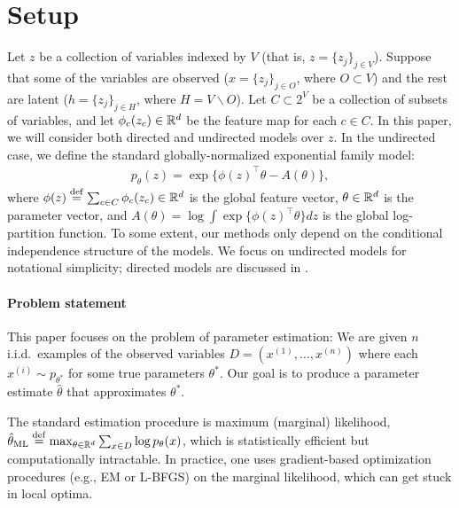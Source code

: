 \section{Setup} \label{sec:setup}

Let $z$ be a collection of variables indexed by $V$ (that is, $z = \{z_j\}_{j \in V}$).
Suppose that some of the variables are observed ($x = \{ z_j \}_{j \in O}$, where $O \subset V$) 
and the rest are latent ($h = \{ z_j \}_{j \in H}$, where $H = V \backslash O$).
Let $C \subset 2^V$ be a collection of subsets of variables,
and let $\phi_c(z_c) \in \mathbb{R}^d$ be the feature map for each $c \in C$.
In this paper, we will consider both directed and undirected models over $z$.
In the undirected case, we define the standard globally-normalized exponential family model:
\begin{align}
  \label{eqn:undirectedSetup}
  p_\theta(z) = \exp\{ \phi(z)^\top\theta - A(\theta) \},
\end{align}
where $\phi(z) \stackrel{\rm def}{=} \sum_{c \in C} \phi_c(z_c) \in \mathbb{R}^d$ is the global feature vector, $\theta \in \mathbb{R}^d$ is the parameter vector,
and $A(\theta) = \log \int \exp\{\phi(z)^\top\theta\} dz$ is the global log-partition function.
To some extent, our methods only depend on the conditional independence
structure of the models.
We focus on undirected models for notational simplicity;
directed models are discussed in .

\paragraph{Problem statement}

This paper focuses on the problem of parameter estimation:
We are given $n$ i.i.d.~examples of the observed variables $D = (x^{(1)}, \dots, x^{(n)})$
where each $x^{(i)} \sim p_{\theta^*}$ for some true parameters $\theta^*$.
Our goal is to produce a parameter estimate $\hat\theta$ that approximates $\theta^*$.

The standard estimation procedure is maximum (marginal) likelihood,
$\hat\theta_\text{\rm ML} \stackrel{\rm def}{=} \max_{\theta \in \mathbb{R}^d} \sum_{x \in D} \log p_\theta(x)$,
which is statistically efficient but computationally intractable.
In practice, one uses gradient-based optimization procedures (e.g., EM or L-BFGS)
on the marginal likelihood, which can get stuck in local optima.
